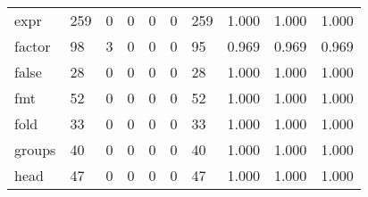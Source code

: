 \begin{longtable}{lp{2.0cm}p{2.0cm}p{2.0cm}p{2.0cm}p{2.0cm}p{2.0cm}p{2.0cm}p{2.0cm}p{2.0cm}}
expr      &                    259 &                                             0 &                                            0 &                                           0 &                                            0 &                                        259 &                                1.000 &                                  1.000 &                                1.000 \\
factor    &                     98 &                                             3 &                                            0 &                                           0 &                                            0 &                                         95 &                                0.969 &                                  0.969 &                                0.969 \\
false     &                     28 &                                             0 &                                            0 &                                           0 &                                            0 &                                         28 &                                1.000 &                                  1.000 &                                1.000 \\
fmt       &                     52 &                                             0 &                                            0 &                                           0 &                                            0 &                                         52 &                                1.000 &                                  1.000 &                                1.000 \\
fold      &                     33 &                                             0 &                                            0 &                                           0 &                                            0 &                                         33 &                                1.000 &                                  1.000 &                                1.000 \\
groups    &                     40 &                                             0 &                                            0 &                                           0 &                                            0 &                                         40 &                                1.000 &                                  1.000 &                                1.000 \\
head      &                     47 &                                             0 &                                            0 &                                           0 &                                            0 &                                         47 &                                1.000 &                                  1.000 &                                1.000 \\

\end{longtable}
